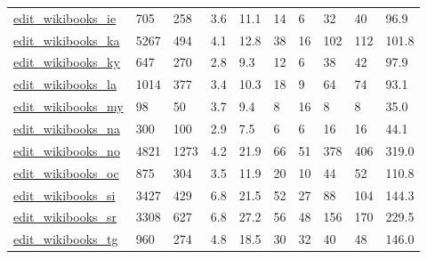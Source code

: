 \begin{longtable}{llllllllll}
 \href{http://konect.cc/networks/edit-enwikibooks}{edit\_wikibooks\_ie}                                                       & 705        & 258   & 3.6    & 11.1   & 14    & 6      & 32     & 40     & 96.9    \\
 \href{http://konect.cc/networks/edit-enwikibooks}{edit\_wikibooks\_ka}                                                       & 5267       & 494   & 4.1    & 12.8   & 38    & 16     & 102    & 112    & 101.8   \\
 \href{http://konect.cc/networks/edit-enwikibooks}{edit\_wikibooks\_ky}                                                       & 647        & 270   & 2.8    & 9.3    & 12    & 6      & 38     & 42     & 97.9    \\
 \href{http://konect.cc/networks/edit-enwikibooks}{edit\_wikibooks\_la}                                                       & 1014       & 377   & 3.4    & 10.3   & 18    & 9      & 64     & 74     & 93.1    \\
 \href{http://konect.cc/networks/edit-enwikibooks}{edit\_wikibooks\_my}                                                       & 98         & 50    & 3.7    & 9.4    & 8     & 16     & 8      & 8      & 35.0    \\
 \href{http://konect.cc/networks/edit-enwikibooks}{edit\_wikibooks\_na}                                                       & 300        & 100   & 2.9    & 7.5    & 6     & 6      & 16     & 16     & 44.1    \\
 \href{http://konect.cc/networks/edit-enwikibooks}{edit\_wikibooks\_no}                                                       & 4821       & 1273  & 4.2    & 21.9   & 66    & 51     & 378    & 406    & 319.0   \\
 \href{http://konect.cc/networks/edit-enwikibooks}{edit\_wikibooks\_oc}                                                       & 875        & 304   & 3.5    & 11.9   & 20    & 10     & 44     & 52     & 110.8   \\
 \href{http://konect.cc/networks/edit-enwikibooks}{edit\_wikibooks\_si}                                                       & 3427       & 429   & 6.8    & 21.5   & 52    & 27     & 88     & 104    & 144.3   \\
 \href{http://konect.cc/networks/edit-enwikibooks}{edit\_wikibooks\_sr}                                                       & 3308       & 627   & 6.8    & 27.2   & 56    & 48     & 156    & 170    & 229.5   \\
 \href{http://konect.cc/networks/edit-enwikibooks}{edit\_wikibooks\_tg}                                                       & 960        & 274   & 4.8    & 18.5   & 30    & 32     & 40     & 48     & 146.0   \\

\end{longtable}
